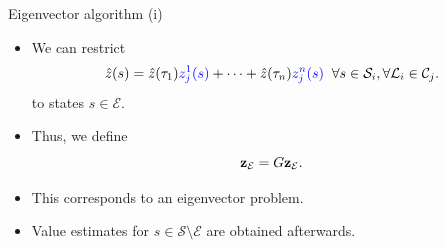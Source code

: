 \documentclass{beamer}
\theoremstyle{mystyle}
\newcommand{\cC}{\mathcal{C}}
\newcommand{\cE}{\mathcal{E}}
\newcommand{\cL}{\mathcal{L}}
\newcommand{\cS}{\mathcal{S}}
\newcommand{\cT}{\mathcal{T}}
\begin{document}
\begin{frame}{Eigenvector algorithm (i)}
    \begin{itemize}
        \item We can restrict
              \begin{equation*}
                  \hat{z}(s)=\hat{z}(\tau_1) {\color{blue} z_j^1(s)}+\cdots+\hat{z}(\tau_n){\color{blue}z_j^n(s)} \;\; \forall s\in\cS_i,\forall\cL_i\in\cC_j.
              \end{equation*}
              to states $s \in \cE$.
        \item Thus, we define
              \begin{equation*}\label{eq:exits}
                  {\bf z}_\cE=G{\bf z}_\cE.
              \end{equation*}
        \item This corresponds to an eigenvector problem.
        \item Value estimates for $s \in \cS \setminus \cE$ are obtained afterwards.
    \end{itemize}

\end{frame}

%
%
%    
%
%
\end{document}
